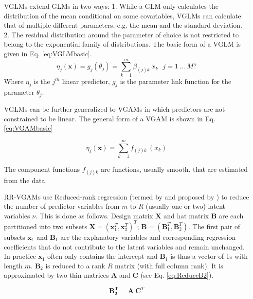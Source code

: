  VGLMs extend GLMs in two ways: 1. While a GLM only calculates the distribution of the mean conditional on some covariables, VGLMs can calculate that of multiple different parameters, e.g. the mean and the standard deviation. 2. The residual distribution around the parameter of choice is not restricted to belong to the exponential family of distributions.
 The basic form of a VGLM is given in Eq. \ref{eq:VGLMbasic}.
 \begin{equation}\label{eq:VGLMbasic} \tag{2.2.1}
 \eta_j(\mathbf{x}) = g_j(\theta_j) = \sum_{k = 1}^m \beta_{(j)k}\ x_k\ \ \  j = 1\ ...\ M?  	
 \end{equation}
 Where $\eta_j$ is the $j^{th}$ linear predictor, $g_j$ is the parameter link function for the parameter $\theta_j$.      
 
 VGLMs can be further generalized to VGAMs in which predictors are not constrained to be linear. The general form of a VGAM is shown in Eq. \ref{eq:VGAMbasic}
 
 \begin{equation}\label{eq:VGAMbasic} \tag{2.2.2}	
 \eta_j(\mathbf{x}) = \sum_{k = 1}^m f_{(j)k}\ (x_k)		
 \end{equation}
 
 The component functions $f_{(j)k}$ are functions, usually smooth, that are estimated from the data. 
 
 RR-VGAMs use Reduced-rank regression (termed by \citet{izenman1975reduced} and proposed by \citet{Anderson1951}) 
 to reduce the number of predictor variables from $m$ to $R$ (usually one or two) latent variables $\nu$.
 This is done as follows.
 Design matrix $\mathbf{X}$ and hat matrix $\mathbf{B}$ are each partitioned into two subsets $\mathbf{X} = (\mathbf{x}_1^T,\mathbf{x}_2^T)^T$; $\mathbf{B} = (\mathbf{B}_1^T,\mathbf{B}_2^T)$. 
 The first pair of subsets $\mathbf{x}_1$ and $\mathbf{B}_1$ are the explanatory variables and corresponding regression coefficients that do not contribute to the latent variables and remain unchanged. 
 In practice $\mathbf{x}_1$ often only contains the intercept and $\mathbf{B}_1$ is thus a vector of 1s with length $m$. $\mathbf{B}_2$ is reduced to a rank $R$ matrix (with full column rank). 
 It is approximated by two thin matrices $\mathbf{A}$ and $\mathbf{C}$ (see Eq. \ref{eq:ReduceB2}).
 
 \begin{equation}\label{eq:ReduceB2}\tag{2.2.3}
 \mathbf{B_2^T} = \mathbf{A}\ \mathbf{C}^T	
 \end{equation}
 
